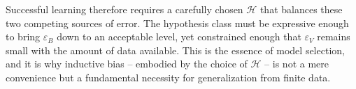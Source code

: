 Successful learning therefore requires a carefully chosen $\mathcal{H}$ that balances these two competing sources of error. The hypothesis class must be expressive enough to bring $\varepsilon_B$ down to an acceptable level, yet constrained enough that $\varepsilon_V$ remains small with the amount of data available. This is the essence of model selection, and it is why inductive bias -- embodied by the choice of $\mathcal{H}$ -- is not a mere convenience but a fundamental necessity for generalization from finite data.





%
%


